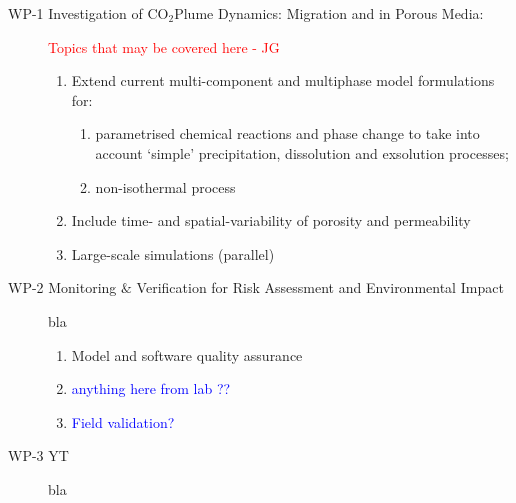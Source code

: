 \documentclass[12pts,a4paper,amsmath,amssymb,floatfix]{article}%
\newcounter{reaction}
\newcommand{\red}{\textcolor{red}}
\newcommand{\blue}{\textcolor{blue}}
\newcommand{\CO}{CO\ensuremath{_{2}}}
\begin{document}
\begin{description}%
%
\item[WP-1 Investigation of \CO Plume Dynamics: Migration and in Porous Media:] \red{Topics that may be covered here - JG}
%
\begin{enumerate}[{WP-1.}1]
%
\item Extend current multi-component and multiphase model formulations for:
\begin{enumerate}
 \item parametrised chemical reactions and phase change to take into account `simple' precipitation, dissolution and exsolution processes;
 \item non-isothermal process
\end{enumerate}
%
\item Include time- and spatial-variability of porosity and permeability
%
\item Large-scale simulations (parallel)
%
\end{enumerate}

%
\item[WP-2 Monitoring $\&$ Verification for Risk Assessment and Environmental Impact] bla
%
\begin{enumerate}[{WP-2.}1]
%
\item Model and software quality assurance
%
\item \blue{anything here from lab ??}
%
\item \blue{Field validation?}
%
\end{enumerate}
%
\item[WP-3 YT] bla
%
\end{description}
\end{document}
